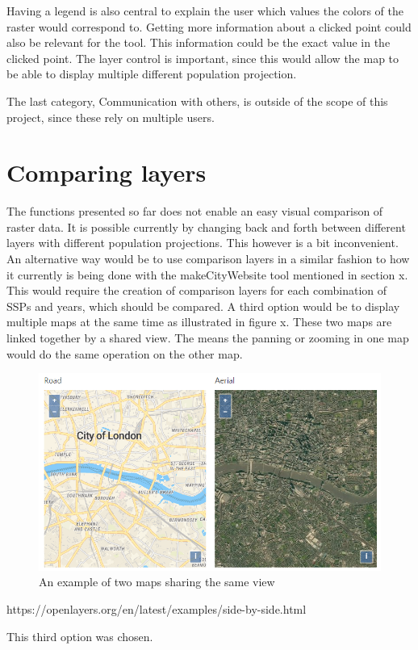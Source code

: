 Having a legend is also central to explain the user which values the colors of the raster would correspond to. Getting more information about a clicked point could also be relevant for the tool. This information could be the exact value in the clicked point. The layer control is important, since this would allow the map to be able to display multiple different population projection.

The last category, Communication with others, is outside of the scope of this project, since these rely on multiple users. %




\section{Comparing layers}

The functions presented so far does not enable an easy visual comparison of raster data. It is possible currently by changing back and forth between different layers with different population projections. This however is a bit inconvenient. 
An alternative way would be to use comparison layers in a similar fashion to how it currently is being done with the makeCityWebsite tool mentioned in section x. This would require the creation of comparison layers for each combination of SSPs and years, which should be compared.   
A third option would be to display multiple maps at the same time as illustrated in figure x. These two maps are linked together by a shared view. The means the panning or zooming in one map would do the same operation on the other map.

\begin{figure} [H]
	\centering
	\includegraphics[width=.8\textwidth]{Pictures/DualMapExample}
	\caption{An example of two maps sharing the same view}
	\label{DualMapExample}
\end{figure}
https://openlayers.org/en/latest/examples/side-by-side.html

This third option was chosen.